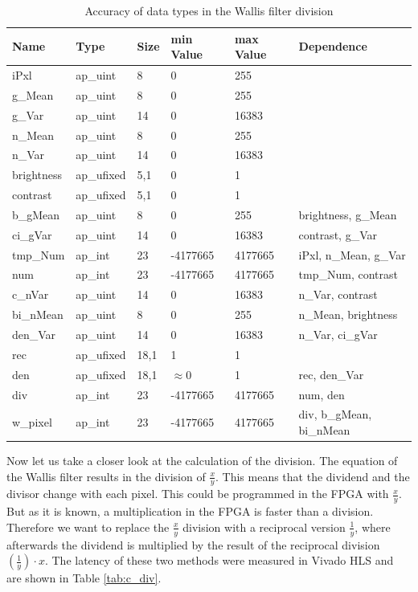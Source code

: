 \begin{table}[tb!]
    \centering
    \begin{tabularx}{\textwidth}{l l l l l l}
        \toprule
        Name & Type & Size & min Value & max Value & Dependence \\
        \midrule
        iPxl & ap\_uint & 8 & 0 & 255 & \\
        g\_Mean & ap\_uint & 8 & 0 & 255 &  \\
        g\_Var & ap\_uint & 14 & 0 & 16383 &  \\
        n\_Mean & ap\_uint & 8 & 0 & 255 &  \\
        n\_Var & ap\_uint & 14 & 0 & 16383 &  \\
        brightness & ap\_ufixed & 5,1 & 0 & 1 &  \\
        contrast & ap\_ufixed & 5,1 & 0 & 1 &  \\
        b\_gMean & ap\_uint & 8 & 0 & 255 &  brightness, g\_Mean\\
        ci\_gVar & ap\_uint & 14 & 0 & 16383 &  contrast, g\_Var\\
        tmp\_Num & ap\_int & 23 & -4177665 & 4177665 &  iPxl, n\_Mean, g\_Var \\
        num & ap\_int & 23 & -4177665 & 4177665 &  tmp\_Num, contrast \\
        c\_nVar & ap\_uint & 14 & 0 & 16383 &  n\_Var, contrast \\
        bi\_nMean & ap\_uint & 8 & 0 & 255 &  n\_Mean, brightness \\
        den\_Var & ap\_uint & 14 & 0 & 16383 &  n\_Var, ci\_gVar \\
        rec & ap\_ufixed & 18,1 & 1 & 1 &   \\
        den & ap\_ufixed & 18,1 & $\approx$0 & 1 &  rec, den\_Var \\
        div & ap\_int & 23 & -4177665 & 4177665 &  num, den \\
        w\_pixel & ap\_int & 23 & -4177665 & 4177665 &  div, b\_gMean, bi\_nMean \\
        \bottomrule
    \end{tabularx}
    \caption{Accuracy of data types in the Wallis filter division}
    \label{tab:datatypes}
\end{table}

Now let us take a closer look at the calculation of the division. The equation
of the Wallis filter results in the division of $\frac{x}{y}$. This means that
the dividend and the divisor change with each pixel. This could be programmed in
the FPGA with $\frac{x}{y}$. But as it is known, a multiplication in the FPGA is
faster than a division. Therefore we want to replace the $\frac{x}{y}$ division with a reciprocal version $\frac{1}{y}$, where afterwards the dividend is multiplied by the result of the reciprocal division $(\frac{1}{y}) \cdot x$. The latency of these two methods were measured in Vivado HLS and are shown in Table \ref{tab:c_div}. \\

